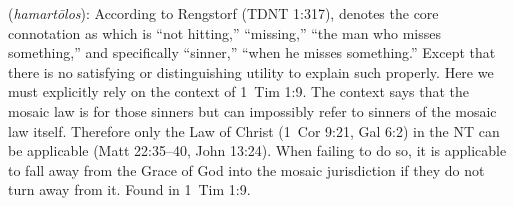 \item[Sinner,]

(\textit{hamartōlos}):
According to Rengstorf (TDNT 1:317),  denotes the core connotation as  which is ``not hitting,'' ``missing,'' ``the man who misses something,'' and  specifically ``sinner,'' ``when he misses something.'' Except that there is no satisfying or distinguishing utility to explain such properly. Here we must explicitly rely on the context of 1~Tim 1:9. The context says that the mosaic law is for those sinners but can impossibly refer to sinners of the mosaic law itself. Therefore only the Law of Christ (1~Cor 9:21, Gal 6:2) in the NT can be applicable (Matt 22:35--40, John 13:24). When failing to do so, it is applicable to fall away from the Grace of God into the mosaic jurisdiction if they do not turn away from it.
Found in 1~Tim 1:9.
